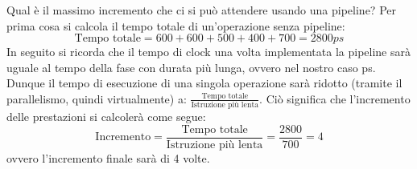 \documentclass[class=book, crop=false, oneside]{standalone}
\begin{document}
Qual è il massimo incremento che ci si può attendere usando una pipeline?
Per prima cosa si calcola il tempo totale di un'operazione senza pipeline:
\begin{equation*}
	\text{Tempo totale} = 600+600+500+400+700 = 2800ps
\end{equation*}
In seguito si ricorda che il tempo di clock una volta implementata la pipeline sarà uguale al tempo della fase con durata più lunga, ovvero nel nostro caso \unit[700]{ps}. Dunque il tempo di esecuzione di una singola operazione sarà ridotto (tramite il parallelismo, quindi virtualmente) a: \(\frac{\text{Tempo totale}}{\text{Istruzione più lenta}}\). Ciò significa che l'incremento delle prestazioni si calcolerà come segue:
\begin{equation*}
	\text{Incremento} = \frac{\text{Tempo totale}}{\text{Istruzione più lenta}} = \frac{2800}{700} = 4
\end{equation*}
ovvero l'incremento finale sarà di 4 volte.
\end{document}
